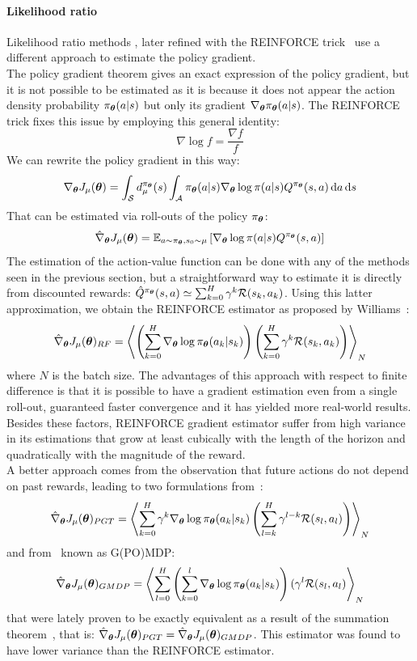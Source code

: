 \paragraph{Likelihood ratio}
Likelihood ratio methods \cite{Glynn:1990:LRG:84537.84552}, later refined with the REINFORCE trick~\cite{Williams1992} use a different approach to estimate the policy gradient.\\
The policy gradient theorem gives an exact expression of the policy gradient, but it is not possible to be estimated as it is because it does not appear the action density probability $\pi_{\vtheta}(a|s)$ but only its gradient $\nabla_\vtheta\pi_{\vtheta}(a|s)$. The REINFORCE trick fixes this issue by employing this general identity:
\[
\nabla\log f = \frac{\nabla f}{f}
\]
We can rewrite the policy gradient in this way:
\[
\gradj = \int_{\sspace} d_\mu^{\pi_{\vtheta}}(s) \int_{\aspace}\pi_{\vtheta}(a|s)\nabla_{\vtheta} \log \pi(a|s) Q^{\pi_{\vtheta}}(s,a) \de a \de s
\]
That can be estimated via roll-outs of the policy $\pi_{\vtheta}$:
\[
\hat{\nabla}_{\vtheta}J_\mu(\vtheta) = \EV[a \sim \pi_{\vtheta}, s_0 \sim \mu]{\nabla_{\vtheta} \log \pi(a|s) Q^{\pi_{\vtheta}}(s,a) }
\]
The estimation of the action-value function can be done with any of the methods seen in the previous section, but a straightforward way to estimate it is directly from discounted rewards: $\hat{Q}^{\pi_{\vtheta}}(s,a) \simeq \sum_{k=0}^H \gamma^k\rfunc (s_k,a_k)$. Using this latter approximation, we obtain the REINFORCE estimator as proposed by Williams~\cite{Williams92simplestatistical}:
\begin{equation}
\label{eq:reinforce}
\hat{\nabla}_{\vtheta}J_\mu(\vtheta)_{RF} = \left\langle \left(\sum_{k=0}^{H} \nabla_{\vtheta}\log\pi_{\vtheta}(a_k|s_k)  \right)\left(\sum_{k=0}^H \gamma^k\rfunc(s_k,a_k)\right) \right\rangle_{N}
\end{equation}
where $N$ is the batch size. The advantages of this approach with respect to finite difference is that it is possible to have a gradient estimation even from a single roll-out, guaranteed faster convergence and it has yielded more real-world results. Besides these factors, REINFORCE gradient estimator suffer from high variance in its estimations that grow at least cubically with the length of the horizon and quadratically with the magnitude of the reward.\\
A better approach comes from the observation that future actions do not depend on past rewards, leading to two formulations from~\cite{Sutton:1999:PGM:3009657.3009806}:
\[
\hat{\nabla}_{\vtheta}J_\mu(\vtheta)_{PGT} = \left\langle \sum_{k=0}^{H} \gamma^k \nabla_{\vtheta}\log\pi_{\vtheta}(a_k|s_k) \left(\sum_{l=k}^H \gamma^{l-k}\rfunc(s_l,a_l)\right) \right\rangle_{N}
\]
and from~\cite{DBLP:journals/corr/abs-1106-0665} known as G(PO)MDP:
\[
\hat{\nabla}_{\vtheta}J_\mu(\vtheta)_{GMDP} = \left\langle \sum_{l=0}^H \left( \sum_{k=0}^{l} \nabla_{\vtheta}\log\pi_{\vtheta}(a_k|s_k) \right) (\gamma^{l}\rfunc(s_l,a_l) \right\rangle_{N}
\]
that were lately proven to be exactly equivalent as a result of the summation theorem~\cite{rade2000springers}, that is: $\hat{\nabla}_{\vtheta}J_\mu(\vtheta)_{PGT} = \hat{\nabla}_{\vtheta}J_\mu(\vtheta)_{GMDP}$.
This estimator was found to have lower variance than the REINFORCE estimator.

